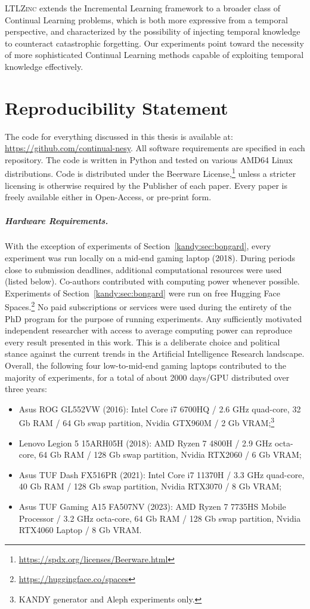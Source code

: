 \documentclass[a4paper,twoside,openright]{book}
\theoremstyle{plain}
\theoremstyle{definition}
\begin{document}
\textsc{LTLZinc} extends the Incremental Learning framework to a broader class of Continual Learning problems, which is both more expressive from a temporal perspective, and characterized by the possibility of injecting temporal knowledge to counteract catastrophic forgetting. Our experiments point toward the necessity of more sophisticated Continual Learning methods capable of exploiting temporal knowledge effectively.


\chapter{Reproducibility Statement}
The code for everything discussed in this thesis is available at: \url{https://github.com/continual-nesy}.
All software requirements are specified in each repository. The code is written in Python and tested on various AMD64 Linux distributions. Code is distributed under the Beerware License,\footnote{\url{https://spdx.org/licenses/Beerware.html}} unless a stricter licensing is otherwise required by the Publisher of each paper.
Every paper is freely available either in Open-Access, or pre-print form.

\paragraph{Hardware Requirements.} With the exception of experiments of Section~\ref{kandy:sec:bongard}, every experiment was run locally on a mid-end gaming laptop (2018). During periods close to submission deadlines, additional computational resources were used (listed below). Co-authors contributed with computing power whenever possible. Experiments of Section~\ref{kandy:sec:bongard} were run on free Hugging Face Spaces.\footnote{\url{https://huggingface.co/spaces}}
No paid subscriptions or services were used during the entirety of the PhD program for the purpose of running experiments. Any sufficiently motivated independent researcher with access to average computing power can reproduce every result presented in this work. This is a deliberate choice and political stance against the current trends in the Artificial Intelligence Research landscape.
%
Overall, the following four low-to-mid-end gaming laptops contributed to the majority of experiments, for a total of about 2000 days/GPU distributed over three years:
\begin{itemize}
	\item Asus ROG GL552VW (2016): Intel Core i7 6700HQ / 2.6 GHz quad-core, 32 Gb RAM / 64 Gb swap partition, Nvidia GTX960M / 2 Gb VRAM;\footnote{\textsc{KANDY} generator and Aleph experiments only.}
	\item Lenovo Legion 5 15ARH05H (2018): AMD Ryzen 7 4800H / 2.9 GHz octa-core, 64 Gb RAM / 128 Gb swap partition, Nvidia RTX2060 / 6 Gb VRAM;
	\item Asus TUF Dash FX516PR (2021): Intel Core i7 11370H / 3.3 GHz quad-core, 40 Gb RAM / 128 Gb swap partition, Nvidia RTX3070 / 8 Gb VRAM;
	\item Asus TUF Gaming A15 FA507NV (2023): AMD Ryzen 7 7735HS Mobile Processor / 3.2 GHz octa-core, 64 Gb RAM / 128 Gb swap partition, Nvidia RTX4060 Laptop / 8 Gb VRAM.
\end{itemize}
\end{document}
